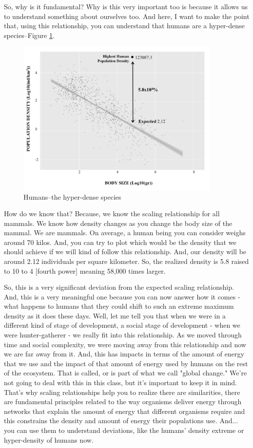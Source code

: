 \documentclass[]{article}
\begin{document}
So, why is it fundamental?
Why is this very important too
is because it allows us to understand
something about ourselves too.
And here, I want to make the point that,
using this relationship,
you can understand that humans
are a hyper-dense species--Figure \ref{fig:Hyperdense}.
\begin{figure}[H]
	\caption{Humans--the hyper-dense species}\label{fig:Hyperdense}
	\includegraphics[width=0.9\textwidth]{Hyperdense}
\end{figure}
How do we know that?
Because, we know the scaling
relationship for all mammals.
We know how density changes as you
change the body size of the mammal.
We are mammals.
On average, a human being
you can consider weighs around 70 kilos.
And, you can try to plot which would be
the density that we should achieve
if we will kind of
follow this relationship.
And, our density will be around
2.12 individuals per square kilometer.
So, the realized density is
5.8 raised to 10 to 4 [fourth power]
meaning 58,000 times larger.

So, this is a very significant deviation
from the expected scaling relationship.
And, this is a very meaningful one
because
you can now answer how it comes -
what happens to humans
that they could shift to
such an extreme maximum density
as it does these days.
Well, let me tell you that
when we were in a different kind of
stage of development,
a social stage of development -
when we were hunter-gatherer -
we really fit into this relationship.
As we moved through time
and social complexity,
we were moving away
from this relationship
and now we are far away from it.
And, this has impacts in terms of
the amount of energy that we use
and the impact of that amount of energy
used by humans
on the rest of the ecosystem.
That is called, or is part of
what we call "global change."
We're not going to deal with this
in this class,
but it's important to keep it in mind.
That's why scaling relationships help you
to realize there are similarities,
there are fundamental principles
related to the way
organisms deliver energy
through networks
that explain the amount of energy
that different organisms require
and this constrains the density
and amount of energy
their populations use.
And... you can use them
to understand deviations,
like the humans' density extreme
or hyper-density of humans now.
\end{document}
